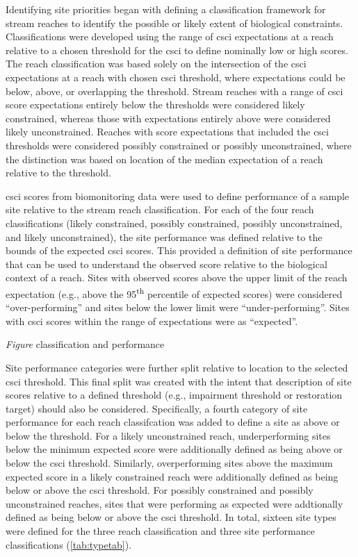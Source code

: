 \documentclass[]{article}
\begin{document}
Identifying site priorities began with defining a classification
framework for stream reaches to identify the possible or likely extent
of biological constraints. Classifications were developed using the
range of \ac{csci} expectations at a reach relative to a chosen
threshold for the \ac{csci} to define nominally low or high scores. The
reach classification was based solely on the intersection of the
\ac{csci} expectations at a reach with chosen \ac{csci} threshold, where
expectations could be below, above, or overlapping the threshold. Stream
reaches with a range of \ac{csci} score expectations entirely below the
thresholds were considered likely constrained, whereas those with
expectations entirely above were considered likely unconstrained.
Reaches with score expectations that included the \ac{csci} thresholds
were considered possibly constrained or possibly unconstrained, where
the distinction was based on location of the median expectation of a
reach relative to the threshold.

\ac{csci} scores from biomonitoring data were used to define performance
of a sample site relative to the stream reach classification. For each
of the four reach classifications (likely constrained, possibly
constrained, possibly unconstrained, and likely unconstrained), the site
performance was defined relative to the bounds of the expected \ac{csci}
scores. This provided a definition of site performance that can be used
to understand the observed score relative to the biological context of a
reach. Sites with observed scores above the upper limit of the reach
expectation (e.g., above the 95\textsuperscript{th} percentile of
expected scores) were considered ``over-performing'' and sites below the
lower limit were ``under-performing''. Sites with \ac{csci} scores
within the range of expectations were as ``expected''.

\emph{Figure} classification and performance

Site performance categories were further split relative to location to
the selected \ac{csci} threshold. This final split was created with the
intent that description of site scores relative to a defined threshold
(e.g., impairment threshold or restoration target) should also be
considered. Specifically, a fourth category of site performance for each
reach classifcation was added to define a site as above or below the
threshold. For a likely unconstrained reach, underperforming sites below
the minimum expected score were additionally defined as being above or
below the \ac{csci} threshold. Similarly, overperforming sites above the
maximum expected score in a likely constrained reach were additionally
defined as being below or above the \ac{csci} threshold. For possibly
constrained and possibly unconstrained reaches, sites that were
performing as expected were addtionally defined as being below or above
the \ac{csci} threshold. In total, sixteen site types were defined for
the three reach classification and three site performance
classifications (\cref{tab:typetab}).
\end{document}
